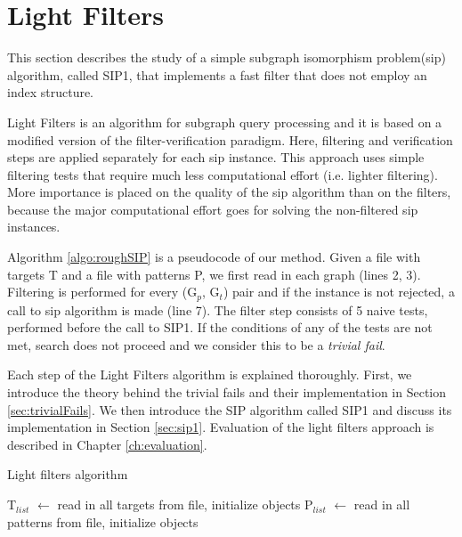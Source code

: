 \documentclass{l4proj}
\begin{document}


\chapter{Light Filters}
\label{ch:sip1}
This section describes the study of a simple subgraph isomorphism problem(\gls{sip}) algorithm, called SIP1, that implements a fast filter that does not employ an index structure.

Light Filters is an algorithm for subgraph query processing and it is based on a modified version of the filter-verification paradigm. Here, filtering and verification steps are applied separately for each \gls{sip} instance. This approach uses simple filtering tests that require much less computational effort (i.e. lighter filtering). More importance is placed on the quality of the \gls{sip} algorithm than on the filters, because the major computational effort goes for solving the non-filtered \gls{sip} instances. 

Algorithm \ref{algo:roughSIP} is a pseudocode of our method. Given a file with targets T and a file with patterns P, we first read in each graph (lines 2, 3). Filtering is performed for every (G$_{p}$, G$_{t}$) pair and if the instance is not rejected, a call to \gls{sip} algorithm is made (line 7). The filter step consists of 5 naive tests, performed before the call to SIP1. If the conditions of any of the tests are not met, search does not proceed and we consider this to be a \textit{trivial fail}. 

Each step of the Light Filters algorithm is explained thoroughly. First, we introduce the theory behind the trivial fails and their implementation in Section \ref{sec:trivialFails}. We then introduce the SIP algorithm called SIP1 and discuss its implementation in Section \ref{sec:sip1}. Evaluation of the light filters approach is described in Chapter \ref{ch:evaluation}.

\begin{algorithm}
\centering
\caption{Light filters algorithm}
\label{algo:roughSIP}
\begin{algorithmic}[1]
 
\State T$_{list}$ $\gets$ read in all targets from file, initialize objects
\State P$_{list}$ $\gets$ read in all patterns from file, initialize objects
		 
    	\EndIf
    \EndFor
\EndFor
\EndProcedure
\end{algorithmic}
\end{algorithm}
\end{document}
